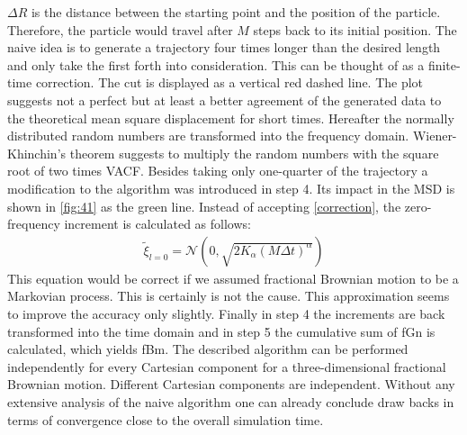 \documentclass[
  a4paper,BCOR10mm,twoside,
  headsepline,footsepline,%
  fleqn,openbib
]{scrbook}
\begin{document}
$\Delta R $ is the distance between the starting point and the position of the particle. Therefore, the particle would travel after $M$ steps back to its initial position. The naive idea is to generate a trajectory four times longer than the desired length and only take the first forth into consideration. This can be thought of as a finite-time correction. The cut is displayed as a vertical red dashed line. The plot suggests not a perfect but at least a better agreement of the generated data to the theoretical mean square displacement for short times. Hereafter the normally distributed random numbers are transformed into the frequency domain. Wiener-Khinchin's theorem suggests to multiply the random numbers with the square root of two times VACF. Besides taking only one-quarter of the trajectory a modification to the algorithm was introduced in step 4. Its impact in the MSD is shown in \cref{fig:41} as the green line. Instead of accepting  \cref{correction}, the zero-frequency increment is calculated as follows:
\begin{align}
 \tilde{\xi}_{l=0} = \mathcal{N}(0,\sqrt{2 K_{\alpha} (M \Delta t)^\alpha})
\end{align}
This equation would be correct if we assumed fractional Brownian motion to be a Markovian process. This is certainly is not the cause. This approximation seems to improve the accuracy only slightly.
Finally in step 4 the increments are back transformed into the time domain and in step 5 the cumulative sum of fGn is calculated, which yields fBm. The described algorithm can be performed independently for every Cartesian component for a three-dimensional fractional Brownian motion. Different Cartesian components are independent. Without any extensive analysis of the naive algorithm one can already conclude draw backs in terms of convergence close to the overall simulation time. 
\end{document}
